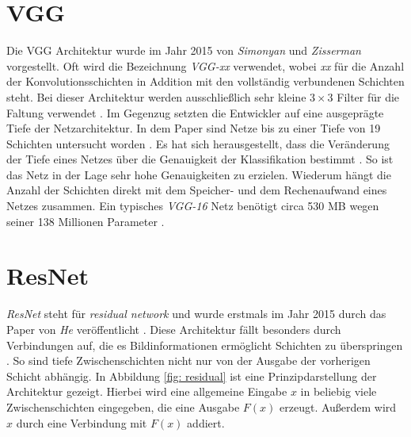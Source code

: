 		\section*{VGG}
		\label{subsec: vgg}
		Die VGG Architektur wurde im Jahr 2015 von \textit{Simonyan} und \textit{Zisserman} \cite{vgg} vorgestellt. Oft wird die Bezeichnung \textit{VGG-xx} verwendet, wobei \textit{xx} für die Anzahl der Konvolutionsschichten in Addition mit den vollständig verbundenen Schichten steht. Bei dieser Architektur werden ausschließlich sehr kleine $3 \times 3$ Filter für die Faltung verwendet \cite{vgg}. Im Gegenzug setzten die Entwickler auf eine ausgeprägte Tiefe der Netzarchitektur. In dem Paper sind Netze bis zu einer Tiefe von 19 Schichten untersucht worden \cite{vgg}. Es hat sich herausgestellt, dass die Veränderung der Tiefe eines Netzes über die Genauigkeit der Klassifikation bestimmt \cite{vgg}. So ist das Netz in der Lage sehr hohe Genauigkeiten zu erzielen. Wiederum hängt die Anzahl der Schichten direkt mit dem Speicher- und dem Rechenaufwand eines Netzes zusammen. Ein typisches \textit{VGG-16} Netz benötigt circa 530 MB wegen seiner 138 Millionen Parameter \cite{keras}.\\
		
		\section*{ResNet}
		\label{subsec: resnet}
		\textit{ResNet} steht für \textit{residual network} und wurde erstmals im Jahr 2015 durch das Paper von \textit{He} veröffentlicht \cite{resnet}. Diese Architektur fällt besonders durch Verbindungen auf, die es Bildinformationen ermöglicht Schichten zu überspringen \cite{resnet}. So sind tiefe Zwischenschichten nicht nur von der Ausgabe der vorherigen Schicht abhängig. In Abbildung \ref{fig: residual} ist eine Prinzipdarstellung der Architektur gezeigt. Hierbei wird eine allgemeine Eingabe $x$ in beliebig viele Zwischenschichten eingegeben, die eine Ausgabe $F(x)$ erzeugt. Außerdem wird $x$ durch eine Verbindung mit $F(x)$ addiert.
		
